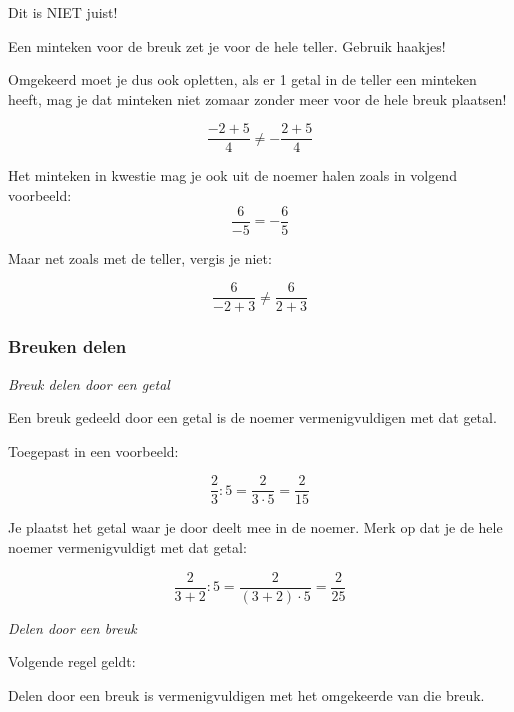 Dit is NIET juist!

\begin{ftonthoud}
	Een minteken voor de breuk zet je voor de hele teller. Gebruik haakjes!
\end{ftonthoud}

Omgekeerd moet je dus ook opletten, als er 1 getal in de teller een minteken heeft, mag je dat minteken niet zomaar zonder meer voor de hele breuk plaatsen!

\begin{equation*}
\frac{-2+5}{4} \ne -\frac{2+5}{4}
\end{equation*}

Het minteken in kwestie mag je ook uit de noemer halen zoals in volgend voorbeeld:
\begin{equation*}
\frac{6}{-5}=-\frac{6}{5}
\end{equation*}

Maar net zoals met de teller, vergis je niet:

\begin{equation*}
\frac{6}{-2+3} \ne \frac{6}{2+3}
\end{equation*}

\subsubsection{Breuken delen}

\emph{Breuk delen door een getal}

\begin{ftonthoud}
	Een breuk gedeeld door een getal is de noemer vermenigvuldigen met dat getal.
\end{ftonthoud}

Toegepast in een voorbeeld:

\begin{equation*}
\frac{2}{3}:5=\frac{2}{3 \cdot 5} = \frac{2}{15}
\end{equation*}

Je plaatst het getal waar je door deelt mee in de noemer. Merk op dat je de hele noemer vermenigvuldigt met dat getal:

\begin{equation*}
\frac{2}{3+2}:5=\frac{2}{(3+2) \cdot 5} = \frac{2}{25}
\end{equation*}

\emph{Delen door een breuk}

Volgende regel geldt:

\begin{ftrekenregel}
	Delen door een breuk is vermenigvuldigen met het omgekeerde van die breuk.
\end{ftrekenregel}

